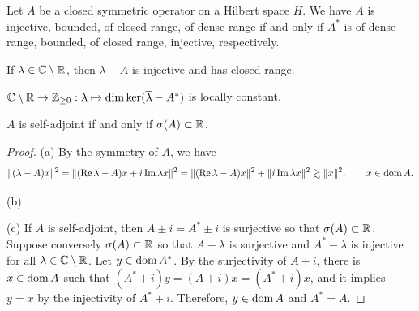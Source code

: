 \documentclass{../../large}
\begin{document}
\begin{prb}
Let $A$ be a closed symmetric operator on a Hilbert space $H$.
We have $A$ is injective, bounded, of closed range, of dense range if and only if $A^*$ is of dense range, bounded, of closed range, injective, respectively.
\begin{parts}
\item If $\lambda\in\mathbb{C}\setminus\mathbb{R}$, then $\lambda-A$ is injective and has closed range.
\item $\mathbb{C}\setminus\mathbb{R}\to\mathbb{Z}_{\ge0}:\lambda\mapsto\dim\ker(\overline\lambda-A^*)$ is locally constant.
\item $A$ is self-adjoint if and only if $\sigma(A)\subset\mathbb{R}$.
\end{parts}
\end{prb}
\begin{proof}
(a)
By the symmetry of $A$, we have
\[\|(\lambda-A)x\|^2=\|(\operatorname{Re}\lambda-A)x+i\operatorname{Im}\lambda x\|^2=\|(\operatorname{Re}\lambda-A)x\|^2+\|i\operatorname{Im}\lambda x\|^2\gtrsim\|x\|^2,\qquad x\in\operatorname{dom} A.\]

(b)

(c)
If $A$ is self-adjoint, then $A\pm i=A^*\pm i$ is surjective so that $\sigma(A)\subset\mathbb{R}$.
Suppose conversely $\sigma(A)\subset\mathbb{R}$ so that $A-\lambda$ is surjective and $A^*-\lambda$ is injective for all $\lambda\in\mathbb{C}\setminus\mathbb{R}$.
Let $y\in\operatorname{dom} A^*$.
By the surjectivity of $A+i$, there is $x\in\operatorname{dom} A$ such that $(A^*+i)y=(A+i)x=(A^*+i)x$, and it implies $y=x$ by the injectivity of $A^*+i$.
Therefore, $y\in\operatorname{dom} A$ and $A^*=A$.
\end{proof}
\end{document}
